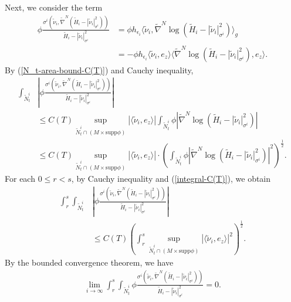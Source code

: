 \documentclass[11pt, letterpaper]{amsart}
\theoremstyle{definition}
\theoremstyle{remark}
\begin{document}
Next, we consider the term
\begin{align*}
	 \phi \frac{\sigma ^{i}( \tilde{\nu}_{i} , \tilde{\nabla} ^{N}(\tilde{H}_{i}- |\tilde{\nu}_{i} |^2_{\sigma^{i} }) )}{\tilde{H}_{i}- |\tilde{\nu}_{i} |^2_{\sigma ^{i}}} & = \phi  h_{\epsilon _{i}} \langle \tilde{\nu }_{i}, \tilde{\nabla} ^{N}\log (\tilde{H}_{i}-|\tilde{\nu}_{i} |^2_{\sigma^{i} })\rangle_{g}\\
																										       &= -\phi h_{\epsilon _i} \langle \tilde{\nu }_i, e_z \rangle \langle \tilde{\nabla} ^{N}\log (\tilde{H}_{i}-|\tilde{\nu}_{i} |^2_{\sigma^{i} }), e_z \rangle.
\end{align*} 
By (\ref{N_t-area-bound-C(T)}) and Cauchy inequality, 
\begin{align*}
	\int_{\tilde{N}^{i}_{t}} &\left| \phi \frac{\sigma ^{i}( \tilde{\nu}_{i} , \tilde{\nabla} ^{N}(\tilde{H}_{i}- |\tilde{\nu}_{i} |^2_{\sigma^{i} }) )}{\tilde{H}_{i}- |\tilde{\nu}_{i} |^2_{\sigma ^{i}}}\right| \\
	&\leq C(T) \sup_{\tilde{N}^{i}_{t} \cap (M \times \mathrm{supp} \phi )} |\langle \tilde{\nu }_{i}, e_{z} \rangle| \int_{\tilde{N}^{i}_t} \phi  | \tilde{\nabla} ^{N}\log (\tilde{H}_{i}-|\tilde{\nu}_{i} |^2_{\sigma^{i} })|\\
																										      &\leq C(T) \sup_{\tilde{N}^{i}_{t} \cap (M \times \mathrm{supp} \phi )} |\langle \tilde{\nu }_{i}, e_{z} \rangle| \cdot \left(  \int_{\tilde{N}^{i}_t} \phi  | \tilde{\nabla} ^{N}\log (\tilde{H}_{i}-|\tilde{\nu}_{i} |^2_{\sigma^{i} })|^2 \right) ^{\frac{1}{2}}  .
\end{align*}
For each $0\leq r<s$, by Cauchy inequality and (\ref{integral-C(T)}), we obtain
\begin{align*}
	\int_{r}^{s} \int_{\tilde{N}^{i}_{t}} &\left| \phi \frac{\sigma ^{i}( \tilde{\nu}_{i} , \tilde{\nabla} ^{N}(\tilde{H}_{i}- |\tilde{\nu}_{i} |^2_{\sigma^{i} }) )}{\tilde{H}_{i}- |\tilde{\nu}_{i} |^2_{\sigma ^{i}}}\right|\\
						&\leq C(T) \left( \int_{r}^{s}  \sup_{\tilde{N}^{i}_{t} \cap (M \times \mathrm{supp} \phi )} |\langle \tilde{\nu }_{i}, e_{z} \rangle| ^2 \right) ^{\frac{1}{2}}.
\end{align*} 
By the bounded convergence theorem, we have
\begin{align*}
	\lim_{i\to \infty} \int_{r}^{s} \int_{\tilde{N}^{i}_{t}}\phi \frac{\sigma ^{i}( \tilde{\nu}_{i} , \tilde{\nabla} ^{N}(\tilde{H}_{i}- |\tilde{\nu}_{i} |^2_{\sigma^{i} }) )}{\tilde{H}_{i}- |\tilde{\nu}_{i} |^2_{\sigma ^{i}}} =0.
\end{align*} 
\end{document}
